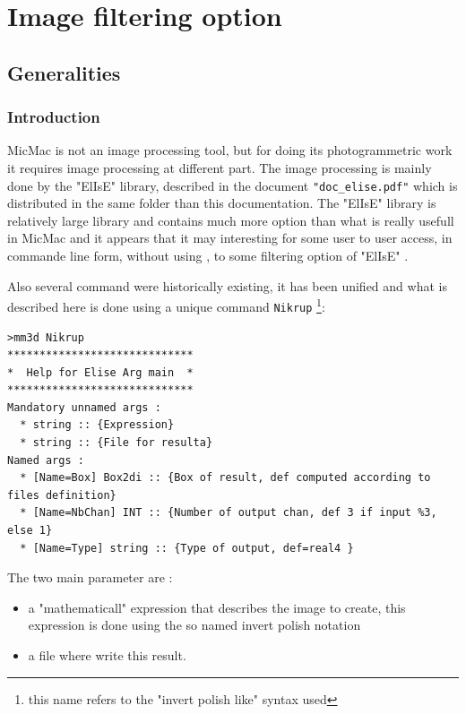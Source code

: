 \chapter{Image filtering option}


\section{Generalities }

\subsection{Introduction }
MicMac is not an image processing tool, but for doing its photogrammetric
work it requires image processing at different part. The image processing
is mainly done by the "ElIsE" library, described in the document {\tt "doc\_elise.pdf"}
which is distributed in the same folder than this documentation.
The   "ElIsE" library is relatively large library and contains much
more option than what is really usefull in MicMac and it appears
that it may interesting for some user to user access, in commande
line form, without using \CPP, to some filtering option of  "ElIsE" .


Also several command were historically existing, it has been unified
and what is described here is done using a unique command 
{\tt Nikrup}  \footnote{this name refers to the "invert polish like" syntax used}:

\begin{verbatim}
>mm3d Nikrup
*****************************
*  Help for Elise Arg main  *
*****************************
Mandatory unnamed args : 
  * string :: {Expression}
  * string :: {File for resulta}
Named args : 
  * [Name=Box] Box2di :: {Box of result, def computed according to files definition}
  * [Name=NbChan] INT :: {Number of output chan, def 3 if input %3, else 1}
  * [Name=Type] string :: {Type of output, def=real4 }
\end{verbatim}

The two main parameter are :

\begin{itemize}
   \item a "mathematicall" expression that describes the image to create, this expression is
        done using the so named  invert polish notation
   \item a file where write this result.
\end{itemize}

